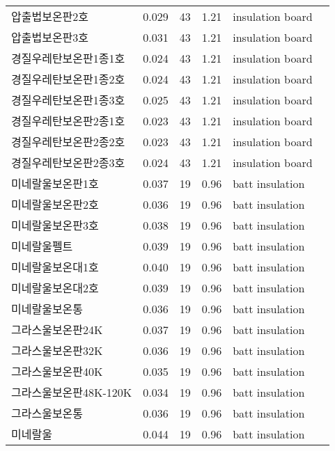 \begin{longtable}{llcclc}
  압출법보온판2호 &   0.029 &   43 & 1.21 & insulation board & \cite{ashrae_f18} \\
  압출법보온판3호 &   0.031 &   43 & 1.21 & insulation board & \cite{ashrae_f18} \\
  경질우레탄보온판1종1호 &   0.024 &   43 & 1.21 & insulation board & \cite{ashrae_f18} \\
  경질우레탄보온판1종2호 &   0.024 &   43 & 1.21 & insulation board & \cite{ashrae_f18} \\
  경질우레탄보온판1종3호 &   0.025 &   43 & 1.21 & insulation board & \cite{ashrae_f18} \\
  경질우레탄보온판2종1호 &   0.023 &   43 & 1.21 & insulation board & \cite{ashrae_f18} \\
  경질우레탄보온판2종2호 &   0.023 &   43 & 1.21 & insulation board & \cite{ashrae_f18} \\
  경질우레탄보온판2종3호 &   0.024 &   43 & 1.21 & insulation board & \cite{ashrae_f18} \\
  미네랄울보온판1호 &   0.037 &   19 & 0.96 & batt insulation & \cite{ashrae_f18} \\
  미네랄울보온판2호 &   0.036 &   19 & 0.96 & batt insulation & \cite{ashrae_f18} \\
  미네랄울보온판3호 &   0.038 &   19 & 0.96 & batt insulation & \cite{ashrae_f18} \\
  미네랄울펠트 &   0.039 &   19 & 0.96 & batt insulation & \cite{ashrae_f18} \\
  미네랄울보온대1호 &   0.040 &   19 & 0.96 & batt insulation & \cite{ashrae_f18} \\
  미네랄울보온대2호 &   0.039 &   19 & 0.96 & batt insulation & \cite{ashrae_f18} \\
  미네랄울보온통 &   0.036 &   19 & 0.96 & batt insulation & \cite{ashrae_f18} \\
  그라스울보온판24K &   0.037 &   19 & 0.96 & batt insulation & \cite{ashrae_f18} \\
  그라스울보온판32K &   0.036 &   19 & 0.96 & batt insulation & \cite{ashrae_f18} \\
  그라스울보온판40K &   0.035 &   19 & 0.96 & batt insulation & \cite{ashrae_f18} \\
  그라스울보온판48K-120K &   0.034 &   19 & 0.96 & batt insulation & \cite{ashrae_f18} \\
  그라스울보온통 &   0.036 &   19 & 0.96 & batt insulation & \cite{ashrae_f18} \\
  미네랄울 &   0.044 &   19 & 0.96 & batt insulation & \cite{ashrae_f18} \\

\end{longtable}
